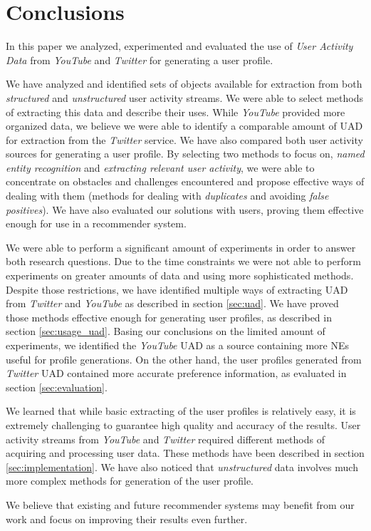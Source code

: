 \section{Conclusions}
\label{sec:conclusion}

In this paper we analyzed, experimented and evaluated the use of \textit{User Activity Data} from \textit{YouTube}
and \textit{Twitter} for generating a user profile.

We have analyzed and identified sets of objects available for extraction from both \textit{structured} and
\textit{unstructured} user activity streams. We were able to select methods of extracting this data and describe
their uses. While \textit{YouTube} provided more organized data, we believe we were able to identify a comparable
amount of UAD for extraction from the \textit{Twitter} service.
We have also compared both user activity sources for generating a user profile. By selecting two methods to focus
on, \ie \textit{named entity recognition} and \textit{extracting relevant user activity}, we were able to concentrate
on obstacles and challenges encountered and propose effective ways of dealing with them (\ie methods for dealing with
\textit{duplicates} and avoiding \textit{false positives}). We have also evaluated our solutions with users, proving
them effective enough for use in a recommender system.

We were able to perform a significant amount of experiments in order to answer both research questions. Due to the time
constraints we were not able to perform experiments on greater amounts of data and using more sophisticated methods.
Despite those restrictions, we have identified multiple ways of extracting UAD from \textit{Twitter} and \textit{YouTube}
as described in section \ref{sec:uad}. We have proved those methods effective enough for generating user profiles, as
described in section \ref{sec:usage_uad}. Basing our conclusions on the limited amount of experiments, we identified
the \textit{YouTube} UAD as a source containing more NEs useful for profile generations. On the other hand, the
user profiles generated from \textit{Twitter} UAD contained more accurate preference information, as evaluated in section
\ref{sec:evaluation}.

We learned that while basic extracting of the user profiles is relatively easy, it is extremely challenging to
guarantee high quality and accuracy of the results. User activity streams from \textit{YouTube} and \textit{Twitter}
required different methods of acquiring and processing user data. These methods have been described in section
\ref{sec:implementation}. We have also noticed that \textit{unstructured} data involves much more complex methods
for generation of the user profile.

We believe that existing and future recommender systems may benefit from our work and focus on improving their results
even further.